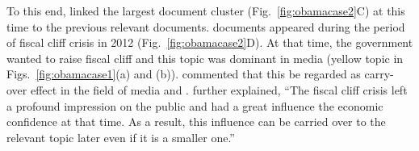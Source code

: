 To this end,  linked the largest document cluster (Fig.~\ref{fig:obamacase2}C) at this time to the previous relevant documents.
 documents appeared during the period of  fiscal cliff crisis in 2012 (Fig.~\ref{fig:obamacase2}D).
At that time, the government wanted to raise  fiscal cliff and this topic was dominant in  media (yellow topic in Figs.~\ref{fig:obamacase1}(a) and (b)).
 commented that this   be regarded as  carry-over effect \cite{carry-over} in the field of media and .
 further explained, ``The fiscal cliff crisis left a profound impression on the public and had a great influence  the economic confidence at that time.
As a result, this influence can be carried over to the relevant topic later even if it is a smaller one.''



